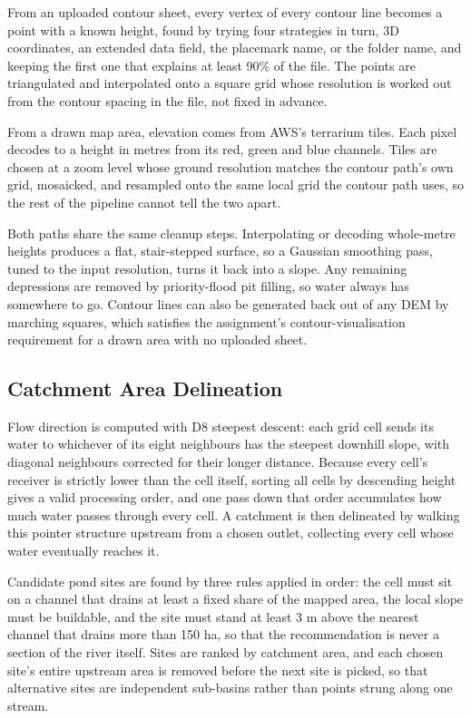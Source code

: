 \documentclass[manuscript,screen,review]{acmart}
\begin{document}
From an uploaded contour sheet, every vertex of every contour line becomes a point with
a known height, found by trying four strategies in turn, 3D coordinates, an extended
data field, the placemark name, or the folder name, and keeping the first one that
explains at least 90\% of the file. The points are triangulated and interpolated onto a
square grid whose resolution is worked out from the contour spacing in the file, not
fixed in advance.

From a drawn map area, elevation comes from AWS's terrarium tiles. Each pixel decodes
to a height in metres from its red, green and blue channels. Tiles are chosen at a zoom
level whose ground resolution matches the contour path's own grid, mosaicked, and
resampled onto the same local grid the contour path uses, so the rest of the pipeline
cannot tell the two apart.

Both paths share the same cleanup steps. Interpolating or decoding whole-metre heights
produces a flat, stair-stepped surface, so a Gaussian smoothing pass, tuned to the input
resolution, turns it back into a slope. Any remaining depressions are removed by
priority-flood pit filling, so water always has somewhere to go. Contour lines can also
be generated back out of any DEM by marching squares, which satisfies the assignment's
contour-visualisation requirement for a drawn area with no uploaded sheet.

\subsection{Catchment Area Delineation}
Flow direction is computed with D8 steepest descent: each grid cell sends its water to
whichever of its eight neighbours has the steepest downhill slope, with diagonal
neighbours corrected for their longer distance. Because every cell's receiver is
strictly lower than the cell itself, sorting all cells by descending height gives a
valid processing order, and one pass down that order accumulates how much water passes
through every cell. A catchment is then delineated by walking this pointer structure
upstream from a chosen outlet, collecting every cell whose water eventually reaches it.

Candidate pond sites are found by three rules applied in order: the cell must sit on a
channel that drains at least a fixed share of the mapped area, the local slope must be
buildable, and the site must stand at least 3 m above the nearest channel that drains
more than 150 ha, so that the recommendation is never a section of the river itself.
Sites are ranked by catchment area, and each chosen site's entire upstream area is
removed before the next site is picked, so that alternative sites are independent
sub-basins rather than points strung along one stream.
\end{document}
